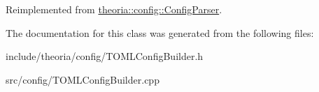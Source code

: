 Reimplemented from \hyperlink{classtheoria_1_1config_1_1ConfigParser_a4eca80a9831324237f2a2aa9a5018c89}{theoria\+::config\+::\+Config\+Parser}.



The documentation for this class was generated from the following files\+:\begin{DoxyCompactItemize}
\item 
include/theoria/config/T\+O\+M\+L\+Config\+Builder.\+h\item 
src/config/T\+O\+M\+L\+Config\+Builder.\+cpp\end{DoxyCompactItemize}
